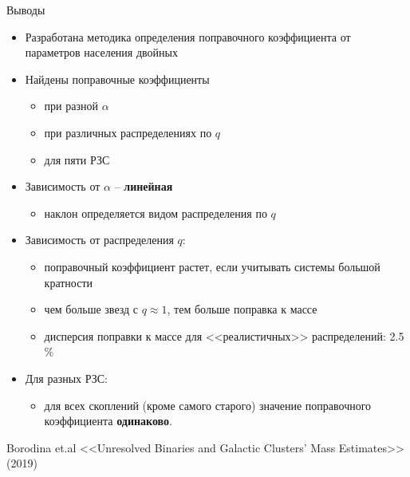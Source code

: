 \documentclass[pdf]{beamer}
\begin{document}
	\begin{frame}{Выводы}
		\begin{itemize}
			\item Разработана методика определения поправочного коэффициента от параметров населения двойных
		
			\item Найдены поправочные коэффициенты
			\begin{itemize}
				\item при разной $\alpha$
				\item при различных распределениях по $q$
				\item для пяти РЗС
			\end{itemize}
			
			\item Зависимость от $\alpha$ --  {\bf линейная}
			\begin{itemize}
				\item наклон определяется видом распределения по $q$
			\end{itemize}
		
			\item Зависимость от распределения $q$:
			\begin{itemize}
				\item поправочный коэффициент растет, если учитывать системы большой кратности
				\item чем больше звезд с $q \approx 1$, тем больше поправка к массе
				\item дисперсия поправки к массе для <<реалистичных>> распределений: 2.5 \%
			\end{itemize}
			
			\item Для разных РЗС:
			\begin{itemize}
				\item для всех скоплений (кроме самого старого) значение поправочного коэффициента {\bf одинаково}.
			\end{itemize}
		\end{itemize}
%		
	\vspace{2cm}

	{\footnotesize Borodina et.al  <<Unresolved Binaries and Galactic Clusters’ Mass Estimates>> (2019)}
	\end{frame}

	
\end{document}

